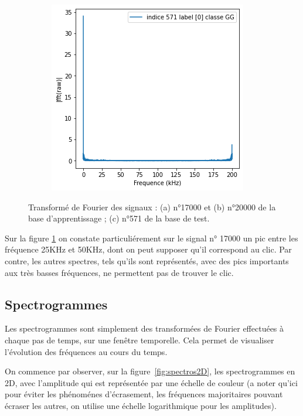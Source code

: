 \begin{figure}[!h]
\begin{subfigure}[b]{0.3\textwidth}
  \end{subfigure}
  \begin{subfigure}[b]{0.3\textwidth}
    \includegraphics[width=\textwidth]{./images/571fft.png}
  \end{subfigure}
  \caption{Transformé de Fourier des signaux : (a) n°17000 et (b) n°20000 de la base d'apprentissage ; (c) n°571 de la base de test.%
\label{fig:tf}}
\end{figure}

Sur la figure \ref{fig:tf} on constate particuliérement sur le signal n° 17000 un pic entre les fréquence 25KHz et 50KHz, dont on peut supposer qu'il correspond au clic.
Par contre, les autres spectres, tels qu'ils sont représentés, avec des pics importants aux très basses fréquences, ne permettent pas de trouver le clic.

\hypertarget{Spectrogrammes}{%
\subsection{Spectrogrammes}
\label{Spectrogrammes}}

Les spectrogrammes sont simplement des transformées de Fourier effectuées à chaque pas de temps, sur une fenêtre temporelle. Cela permet de visualiser l'évolution des fréquences au cours du temps. 

On commence par observer, sur la figure~\ref{fig:spectros2D}, les spectrogrammes en 2D, avec l'amplitude qui est représentée par une échelle de couleur (a noter qu'ici pour éviter les phénoménes d'écrasement, les fréquences majoritaires pouvant écraser les autres, on utilise une échelle logarithmique pour les amplitudes).

